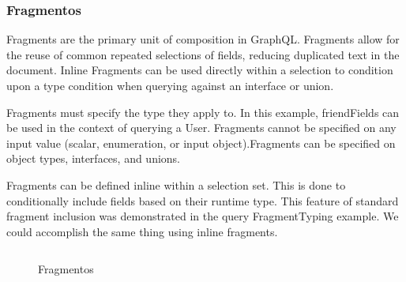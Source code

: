 \subsubsection[Fragmentos]{Fragmentos}

Fragments are the primary unit of composition in GraphQL. Fragments allow for the reuse of common repeated selections of fields, reducing duplicated text in the document. Inline Fragments can be used directly within a selection to condition upon a type condition when querying against an interface or union.

Fragments must specify the type they apply to. In this example, friendFields can be used in the context of querying a User. Fragments cannot be specified on any input value (scalar, enumeration, or input object).Fragments can be specified on object types, interfaces, and unions.

Fragments can be defined inline within a selection set. This is done to conditionally include fields based on their runtime type. This feature of standard fragment inclusion was demonstrated in the query FragmentTyping example. We could accomplish the same thing using inline fragments.

\begin{figure}[H]
  \centering
  \inputminted[frame=single,framesep=10pt]{javascript}{anexos/graphql-fragment.txt}
  \caption{Fragmentos}
\end{figure}
